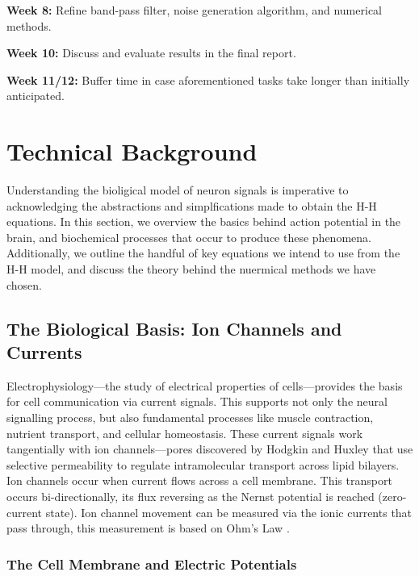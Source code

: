 \documentclass{article} %
\begin{document}
\begin{multicols}{2}
\textbf{Week 8: } Refine band-pass filter, noise generation algorithm, and numerical methods.

\textbf{Week 10: } Discuss and evaluate results in the final report.

\textbf{Week 11/12: } Buffer time in case aforementioned tasks take longer than initially anticipated.


\section{Technical Background}
\label{sec:technical_background}

Understanding the bioligical model of neuron signals is imperative to acknowledging the abstractions and simplfications made to obtain the H-H equations.
In this section, we overview the basics behind action potential in the brain, and biochemical processes that occur to produce these phenomena.
Additionally, we outline the handful of key equations we intend to use from the H-H model, and discuss the theory behind the nuermical methods we have chosen.

\subsection{The Biological Basis: Ion Channels and Currents}
\label{subsec:biological_basis}

Electrophysiology—the study of electrical properties of cells—provides the basis for cell communication via current signals. This supports not only the neural signalling process, but also fundamental processes like muscle contraction, nutrient transport, and cellular homeostasis. These current signals work tangentially with ion channels—pores discovered by Hodgkin and Huxley that use selective permeability to regulate intramolecular transport across lipid bilayers. Ion channels occur when current flows across a cell membrane. This transport occurs bi-directionally, its flux reversing as the Nernst potential is reached (zero-current state). Ion channel movement can be measured via the ionic currents that pass through, this measurement is based on Ohm's Law \citep{rubaiy2017electrophysiology}.

\subsubsection{The Cell Membrane and Electric Potentials}
\label{subsubsec:resting_potential}


\end{multicols}
\end{document}

